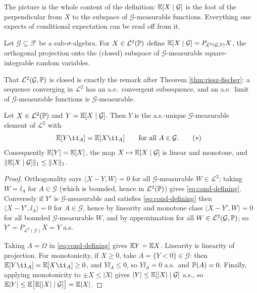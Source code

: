 \documentclass[a4paper]{scrartcl}
\newcommand{\cF}{\mathcal{F}}
\newcommand{\cG}{\mathcal{G}}
\newcommand{\cL}{\mathcal{L}}
\newcommand{\ip}[2]{\langle #1, #2 \rangle}
\newcommand{\ind}{\ii}
\begin{document}
The picture is the whole content of the definition: $\EE[X\mid\cG]$ is the foot of the perpendicular from $X$ to the subspace of $\cG$-measurable functions. Everything one expects of conditional expectation can be read off from it.

\begin{definition}
	Let $\cG \subseteq \cF$ be a sub-$\sigma$-algebra. For $X \in \cL^2(\PP)$ define $\EE[X\mid\cG] = P_{\cL^2(\cG,\PP)}X$, the orthogonal projection onto the (closed) subspace of $\cG$-measurable square-integrable random variables.
\end{definition}

That $\cL^2(\cG,\PP)$ is closed is exactly the remark after Theorem \ref{thm:riesz-fischer}: a sequence converging in $\cL^2$ has an a.e.\ convergent subsequence, and an a.e.\ limit of $\cG$-measurable functions is $\cG$-measurable.

\begin{proposition}\label{prop:cond-props}
	Let $X \in \cL^2(\PP)$ and $Y = \EE[X\mid\cG]$. Then $Y$ is the a.s.-unique $\cG$-measurable element of $\cL^2$ with
	\begin{equation}\label{eq:cond-defining}
		\EE[Y \ind_A] = \EE[X\ind_A] \qquad \text{for all } A \in \cG. \tag{$\ast$}
	\end{equation}
	Consequently $\mathbb{E}[Y]=\mathbb{E}[X]$, the map $X \mapsto \EE[X\mid\cG]$ is linear and monotone, and $\|\EE[X\mid\cG]\|_1 \leq \|X\|_1$.
\end{proposition}
\begin{proof}
	Orthogonality says $\ip{X-Y}{W}=0$ for all $\cG$-measurable $W \in \cL^2$; taking $W = \ind_A$ for $A \in \cG$ (which is bounded, hence in $\cL^2(\PP)$) gives \eqref{eq:cond-defining}. Conversely if $Y'$ is $\cG$-measurable and satisfies \eqref{eq:cond-defining} then $\ip{X-Y'}{\ind_A}=0$ for $A \in \cG$, hence by linearity and monotone class $\ip{X-Y'}{W}=0$ for all bounded $\cG$-measurable $W$, and by approximation for all $W \in \cL^2(\cG,\PP)$; so $Y'=P_{\cL^2(\cG)}X = Y$ a.s.

	Taking $A = \Omega$ in \eqref{eq:cond-defining} gives $\mathbb{E} Y = \mathbb{E} X$. Linearity is linearity of projection. For monotonicity, if $X \geq 0$, take $A = \{Y<0\} \in \cG$: then $\EE[Y\ind_A] = \EE[X\ind_A]\geq 0$, and $Y\ind_A \leq 0$, so $Y\ind_A = 0$ a.s.\ and $\mathbb{P}(A)=0$. Finally, applying monotonicity to $\pm X \leq |X|$ gives $|Y| \leq \EE[|X| \mid \cG]$ a.s., so $\EE|Y| \leq \EE\big[\EE[|X|\mid\cG]\big] = \EE|X|$.
\end{proof}
\end{document}
